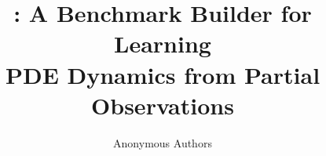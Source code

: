 \documentclass{article}
\title{\dataset: A Benchmark Builder for Learning\\
PDE Dynamics from Partial Observations}
\author{Anonymous Authors}
\begin{document}
\maketitle

\begin{abstract}
\end{abstract}


\clearpage



\clearpage
\appendix
\def\PDEOBSAPPENDIXINPUT{1}

\end{document}
